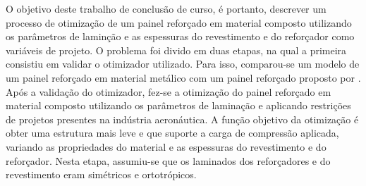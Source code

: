 O objetivo deste trabalho de conclusão de curso, é portanto, descrever um processo de otimização de um painel reforçado em material composto utilizando os parâmetros de laminção e as espessuras do revestimento e do reforçador como variáveis de projeto. O problema foi divido em duas etapas, na qual a primeira consistiu em validar o otimizador utilizado. Para isso, comparou-se um modelo de um painel reforçado em material metálico com um painel reforçado proposto por \cite{niu1997airframe}. Após a validação do otimizador, fez-se a otimização do painel reforçado em material composto utilizando os parâmetros de laminação e aplicando restrições de projetos presentes na indústria aeronáutica. A função objetivo da otimização é obter uma estrutura mais leve e que suporte a carga de compressão aplicada, variando as propriedades do material e as espessuras do revestimento e do reforçador. Nesta etapa, assumiu-se que os laminados dos reforçadores e do revestimento eram simétricos e ortotrópicos.



